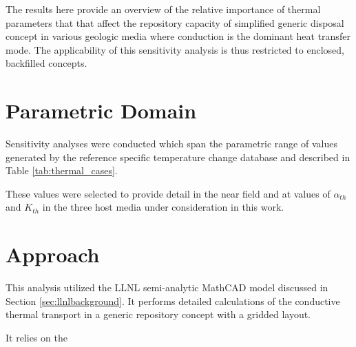 
The results here provide an overview of the relative importance of thermal
parameters that that affect the repository capacity of simplified generic
disposal concept in various geologic media where conduction is the dominant
heat transfer mode. The applicability of this sensitivity analysis is thus
restricted to enclosed, backfilled concepts.  

\section{Parametric Domain}

Sensitivity analyses were conducted which span the parametric range of values 
generated by the reference specific temperature change database and described 
in Table \ref{tab:thermal_cases}.  



These values were selected to provide detail in the near field and at values of
$\alpha_{th}$ and $K_{th}$ in the three host media under consideration in this
work.

\section{Approach}

This analysis utilized the \gls{LLNL} semi-analytic MathCAD model
discussed in Section \ref{sec:llnlbackground}.  It performs detailed
calculations of the conductive thermal transport in a generic repository
concept with a gridded layout.  

It relies on the 


